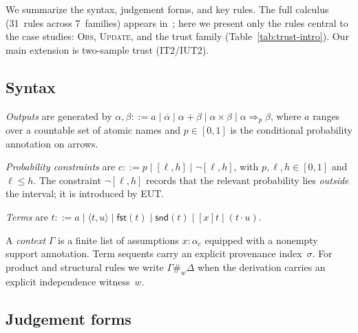 \documentclass{ceurart}
\begin{document}
\smallskip\noindent
We summarize the syntax, judgement forms, and key rules.  The
full calculus (31~rules across 7~families) appears
in~\cite{dasaro2025tptnd}; here we present only the rules
central to the case studies: \textsc{Obs}, \textsc{Update}, and
the trust family (Table~\ref{tab:trust-intro}).  Our main
extension is two-sample trust (\textsc{IT2}/\textsc{IUT2}).

\subsection{Syntax}\label{sec:syntax}

\emph{Outputs} are generated by
$\alpha,\beta ::= a \mid \overline\alpha \mid \alpha+\beta
  \mid \alpha\times\beta \mid \alpha\Rightarrow_p\beta$,
where $a$ ranges over a countable set of atomic names and
$p\in[0,1]$ is the conditional probability annotation on arrows.

\emph{Probability constraints} are
$c ::= p \mid [\ell,h] \mid \lnot[\ell,h]$,
with $p,\ell,h \in [0,1]$ and $\ell\le h$.
The constraint $\lnot[\ell,h]$ records that the relevant
probability lies \emph{outside} the interval; it is introduced by
\textsc{EUT}.

\emph{Terms} are $t ::= a \mid \langle t,u\rangle \mid
  \mathsf{fst}(t) \mid \mathsf{snd}(t) \mid [x]t \mid (t\cdot u)$.

A \emph{context} $\Gamma$ is a finite list of assumptions
$x : \alpha_c$ equipped with a nonempty support annotation.
Term sequents carry an explicit provenance index~$\sigma$.
For product and structural rules we write
$\Gamma\mathbin{\#_w}\Delta$ when the derivation carries an
explicit independence witness~$w$.

\subsection{Judgement forms}\label{sec:judge}
\end{document}
